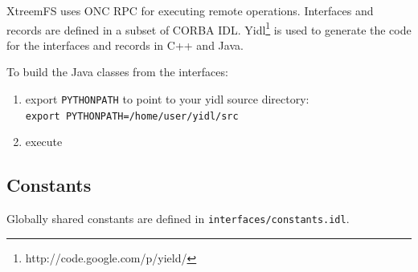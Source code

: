 





XtreemFS uses ONC RPC\cite{RFC1831} for executing remote operations. Interfaces and records are defined in a subset of CORBA IDL. Yidl\footnote{http://code.google.com/p/yield/} is used to generate the code for the interfaces and records in C++ and Java.

To build the Java classes from the interfaces:
\begin{enumerate}
 \item export \texttt{PYTHONPATH} to point to your yidl source directory:\\
       \texttt{export PYTHONPATH=/home/user/yidl/src}
 \item execute 
\end{enumerate}


\makeatletter
\renewcommand\paragraph{\@startsection{paragraph}{4}{\z@}%
  {-3.25ex\@plus -1ex \@minus -.2ex}%
  {0.1ex \@plus .0ex}%
  {\normalfont\normalsize\bfseries}}
\makeatother

\subsection{Constants}
\label{sec:xtreemfs_proto_const}

Globally shared constants are defined in \texttt{in\-ter\-faces/const\-ants.idl}.

